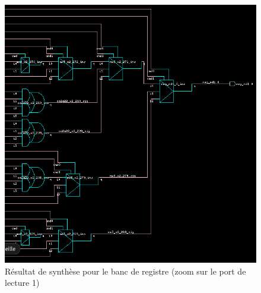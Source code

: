\documentclass[10pt,a4paper]{article}
\begin{document}
			\begin{figure}[H]															%
				\centering 																%
				\includegraphics[width=1.0\textwidth]{reg_rd1(0).png} 					%
				\caption{Résultat de synthèse pour le banc de registre  (zoom sur le port de lecture 1)}
				\label{Fig.main2} 														%
			\end{figure}
\end{document}
